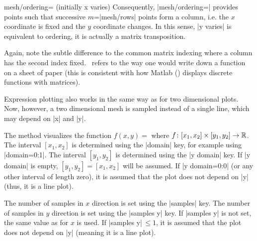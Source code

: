 {\begin{pgfplotskey}{mesh/ordering= (initially x varies)}
	Consequently, |mesh/ordering=| provides points such that successive $m$=|mesh/rows| points form a column, i.e. the $x$ coordinate is fixed and the $y$ coordinate changes. In this sense, |y varies| is equivalent to  ordering, it is actually a matrix transposition.
\begin{codeexample}[]
\end{codeexample}
	Again, note the subtle difference to the common matrix indexing where a column has the second index fixed. \PGFPlots\ refers to the way one would write down a function on a sheet of paper (this is consistent with how Matlab (\textregistered) displays discrete functions with matrices).

\end{pgfplotskey}

\begin{addplot3operation}[]{}{}
\label{cmd:addplot3:expr}
	Expression plotting also works in the same way as for two dimensional plots. Now, however, a two dimensional mesh is sampled instead of a single line, which may depend on |x| and |y|.

	The method   visualizes the function $f(x,y) = $ where $ f \colon [x_1,x_2] \times [y_1,y_2] \to \mathbb{R}$. The interval $[x_1,x_2]$ is determined using the |domain| key, for example using |domain=0:1|. The interval $[y_1,y_2]$ is determined using the |y domain| key. If |y domain| is empty, $[y_1,y_2] = [x_1,x_2]$ will be assumed. If |y domain=0:0| (or any other interval of length zero), it is assumed that the plot does not depend on |y| (thus, it is a line plot).

	The number of samples in $x$ direction is set using the |samples| key. The number of samples in $y$ direction is set using the |samples y| key. If |samples y| is not set, the same value as for $x$ is used. If |samples y|$\,\le 1$, it is assumed that the plot does not depend on |y| (meaning it is a line plot).


\end{addplot3operation}}

